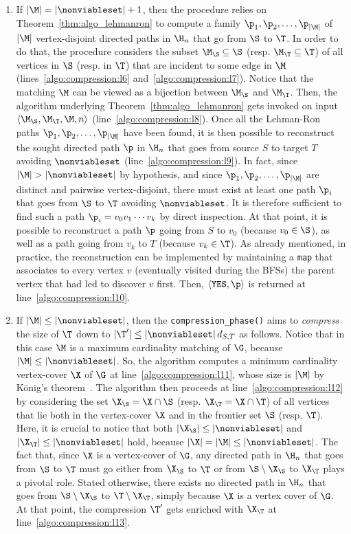 \begin{enumerate}
\item
If $|\M| = |\nonviableset|+1$,
then the procedure relies on Theorem~\ref{thm:algo_lehmanron}
to compute a family $\p_1, \p_2, \ldots, \p_{|\M|}$ of $|\M|$
vertex-disjoint directed paths in $\H_n$ that go from $\S$ to $\T$.
In order to do that, the procedure considers the subset $\M_\S\subseteq\S$ (resp. $\M_\T\subseteq\T$) of all vertices in $\S$ (resp. in $\T$)
that are
incident
to some edge in $\M$ (lines~\ref{algo:compression:l6} and~\ref{algo:compression:l7}).
Notice that the matching $\M$ can be viewed as a bijection between $\M_\S$ and $\M_\T$.
Then, the algorithm underlying Theorem~\ref{thm:algo_lehmanron}
gets invoked on input $\langle \M_\S, \M_\T, \M, n \rangle$ (line~\ref{algo:compression:l8}).
Once all the Lehman-Ron paths $\p_1, \p_2, \ldots, \p_{|\M|}$ have been
found,
it is then possible to reconstruct the sought directed path $\p$ in $\H_n$ that goes from
source $S$ to target $T$  avoiding $\nonviableset$ (line~\ref{algo:compression:l9}).
In fact, since $|\M|>|\nonviableset|$ by hypothesis, and since $\p_1, \p_2, \ldots, \p_{|\M|}$
are distinct and pairwise vertex-disjoint,
there must exist at least one path $\p_i$ that goes from $\S$ to $\T$  avoiding $\nonviableset$.
It is therefore sufficient to find such a path $\p_i=v_0v_1\cdots v_k$ by direct inspection.
At that point, it is possible to reconstruct a path $\p$ going from $S$ to $v_0$ (because $v_0\in\S$),
as well as a path going from $v_k$ to $T$ (because $v_k\in\T$).
As already mentioned, in practice, the reconstruction can be implemented by maintaining a \texttt{map}
that associates to every vertex $v$ (eventually visited during the BFSs)
the parent vertex that had led to discover $v$ first.
Then, $\langle\texttt{YES},\p\rangle$ is returned at line~\ref{algo:compression:l10}.

\item
If $|\M|\leq |\nonviableset|$, then the \texttt{compression\_phase()}
aims to \emph{compress} the size of $\T$ down to $|\T'|\leq|\nonviableset|\, d_{S,T}$
as follows. Notice that in this case
$\M$ is a maximum cardinality matching of $\G$, because $|\M|\leq |\nonviableset|$.
So, the algorithm computes a minimum cardinality
vertex-cover $\X$ of $\G$ at line~\ref{algo:compression:l11},
whose size is $|\M|$ by K\"{o}nig's theorem~\cite{Diestel2005}.
The algorithm then proceeds at line~\ref{algo:compression:l12} by considering the set $\X_\S=\X\cap\S$ (resp. $\X_\T=\X\cap\T$)
of all vertices that lie both in the vertex-cover $\X$ and in the frontier set $\S$ (resp. $\T$).
Here, it is crucial to notice that both
$|\X_\S|\leq |\nonviableset|$ and $|\X_\T|\leq |\nonviableset|$ hold,
because $|\X|=|\M|\leq|\nonviableset|$.
The fact that, since $\X$ is a vertex-cover of $\G$,
any directed path in $\H_n$ that goes from $\S$ to $\T$ must go either from
$\X_\S$ to $\T$ or from $\S\setminus \X_\S$ to $\X_\T$ plays a pivotal role. Stated otherwise,
there exists no directed path in $\H_n$ that goes from $\S\setminus \X_\S$ to $\T\setminus \X_\T$,
simply because $\X$ is a vertex cover of $\G$.
At that point, the compression $\T'$ gets enriched with
$\X_\T$ at line~\ref{algo:compression:l13}.


\end{enumerate}
